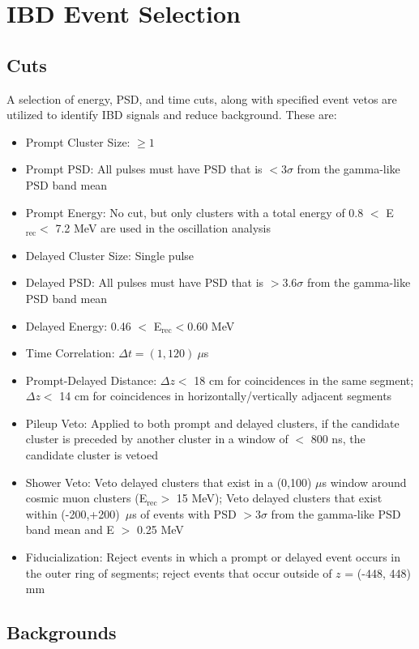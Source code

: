 \section{IBD Event Selection}

\subsection{Cuts}

A selection of energy, PSD, and time cuts, along with specified event vetos are utilized to identify IBD signals and reduce background.
These are:
\begin{itemize}
	\item Prompt Cluster Size: $\geq1$
	\item Prompt PSD: All pulses must have PSD that is $<3\sigma$ from the gamma-like PSD band mean
	\item Prompt Energy: No cut, but only clusters with a total energy of 0.8 $<$ E$_{\textrm{rec}} <$ 7.2 MeV are used in the oscillation analysis
	\item Delayed Cluster Size: Single pulse
	\item Delayed PSD: All pulses must have PSD that is $>3.6\sigma$ from the gamma-like PSD band mean
	\item Delayed Energy: 0.46 $<$ E$_{\textrm{rec}} < $0.60 MeV
	\item Time Correlation: $\Delta t = (1,120)~\mu$s
	\item Prompt-Delayed Distance: $\Delta z <$ 18 cm for coincidences in the same segment; $\Delta z <$ 14 cm for coincidences in horizontally/vertically adjacent segments
	\item Pileup Veto: Applied to both prompt and delayed clusters, if the candidate cluster is preceded by another cluster in a window of $<$ 800 ns, the candidate cluster is vetoed
	\item Shower Veto: Veto delayed clusters that exist in a (0,100) $\mu$s window around cosmic muon clusters (E$_{\textrm{rec}} >$ 15 MeV); Veto delayed clusters that exist within (-200,+200)~$\mu$s of events with PSD $> 3\sigma$ from the gamma-like PSD band mean and E $>$ 0.25 MeV
	\item Fiducialization: Reject events in which a prompt or delayed event occurs in the outer ring of segments; reject events that occur outside of $z$ = (-448, 448) mm 

\end{itemize}

\subsection{Backgrounds}



